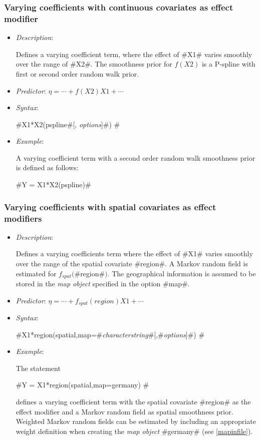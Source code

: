 \subsubsection*{Varying coefficients with continuous covariates as
effect modifier}

\begin{itemize}

\item[] {\em Description}:

Defines a varying coefficient term, where the effect of #X1#
varies smoothly over the range of #X2#. The smoothness prior for
$f(X2)$ is a P-spline with first or second order random walk
prior. \item[] {\em Predictor}: $\eta= \cdots + f(X2)X1 +
\cdots$ \item[] {\em Syntax}:

#X1*X2(pspline#[, {\em options}]#) #

\item[] {\em Example}:

A varying coefficient term with a second order random walk
smoothness prior is defined as follows:

#Y = X1*X2(pspline)#
\end{itemize}


\subsubsection*{Varying coefficients with spatial covariates as
effect modifiers}

\begin{itemize}
\item[] {\em Description}:

Defines a varying coefficients term where the effect of #X1#
varies smoothly over the range of the spatial covariate #region#.
A Markov random field is estimated for $f_{spat}($#region#$)$. The
geographical information is assumed to be stored in the {\em map
object} specified in the option #map#.

\item[] {\em Predictor}: $\eta = \cdots + f_{spat}(region)X1 +
\cdots$

\item[] {\em Syntax}:

#X1*region(spatial,map=#{\em characterstring}#[,#{\em options}]#) #
\item[] {\em Example}:

The statement

#Y = X1*region(spatial,map=germany) #

defines a varying coefficient term with the spatial covariate
#region# as the effect modifier and a Markov random field as spatial
smoothness prior. Weighted Markov random fields can be estimated by
including an appropriate weight definition when creating the {\em
map object} #germany# (see \autoref{mapinfile}).
\end{itemize}


